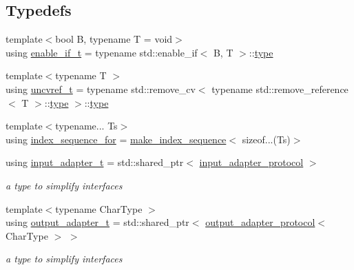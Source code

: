 \subsection*{Typedefs}
\begin{DoxyCompactItemize}
\item 
{\footnotesize template$<$bool B, typename T  = void$>$ }\\using \hyperlink{namespacenlohmann_1_1detail_a02bcbc878bee413f25b985ada771aa9c}{enable\+\_\+if\+\_\+t} = typename std\+::enable\+\_\+if$<$ B, T $>$\+::\hyperlink{classstd_1_1conditional_1_1type}{type}
\item 
{\footnotesize template$<$typename T $>$ }\\using \hyperlink{namespacenlohmann_1_1detail_a53a082eedad9f4729fcd8fed552a21f7}{uncvref\+\_\+t} = typename std\+::remove\+\_\+cv$<$ typename std\+::remove\+\_\+reference$<$ T $>$\+::\hyperlink{classstd_1_1conditional_1_1type}{type} $>$\+::\hyperlink{classstd_1_1conditional_1_1type}{type}
\item 
{\footnotesize template$<$typename... Ts$>$ }\\using \hyperlink{namespacenlohmann_1_1detail_a24800493c6ec02ce033dcbb47b7fd28e}{index\+\_\+sequence\+\_\+for} = \hyperlink{structnlohmann_1_1detail_1_1make__index__sequence}{make\+\_\+index\+\_\+sequence}$<$ sizeof...(Ts)$>$
\item 
using \hyperlink{namespacenlohmann_1_1detail_ae132f8cd5bb24c5e9b40ad0eafedf1c2}{input\+\_\+adapter\+\_\+t} = std\+::shared\+\_\+ptr$<$ \hyperlink{structnlohmann_1_1detail_1_1input__adapter__protocol}{input\+\_\+adapter\+\_\+protocol} $>$
\begin{DoxyCompactList}\small\item\em a type to simplify interfaces \end{DoxyCompactList}\item 
{\footnotesize template$<$typename Char\+Type $>$ }\\using \hyperlink{namespacenlohmann_1_1detail_a9b680ddfb58f27eb53a67229447fc556}{output\+\_\+adapter\+\_\+t} = std\+::shared\+\_\+ptr$<$ \hyperlink{structnlohmann_1_1detail_1_1output__adapter__protocol}{output\+\_\+adapter\+\_\+protocol}$<$ Char\+Type $>$ $>$
\begin{DoxyCompactList}\small\item\em a type to simplify interfaces \end{DoxyCompactList}\end{DoxyCompactItemize}
